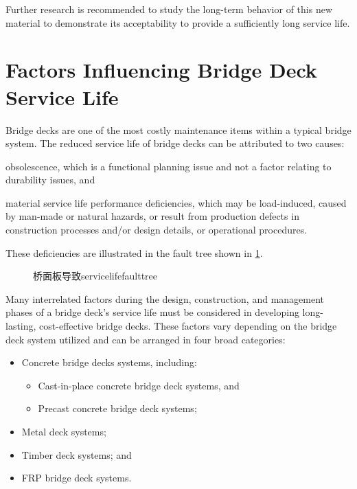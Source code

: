 Further research is recommended to study the long-term behavior of this new material to demonstrate its acceptability to provide a sufficiently long service life.

\section{Factors Influencing Bridge Deck Service Life}
\label{sec:factors-influence}

Bridge decks are one of the most costly maintenance items within a typical bridge system. The reduced service life of bridge decks can be attributed to two causes: 
\begin{enumerate*}
  \item obsolescence, which is a functional planning issue and not a factor relating to durability issues, and 
  \item material service life performance deficiencies, which may be load-induced, caused by man-made or natural hazards, or result from production defects in construction processes and/or design details, or operational procedures. 
\end{enumerate*}
These deficiencies are illustrated in the fault tree shown in \cref{fig:fault-tree-bridge-deck}.

\begin{figure}
  \caption{桥面板导致\gls*{servicelife}\gls*{faulttree}}
  \label{fig:fault-tree-bridge-deck}
\end{figure}

Many interrelated factors during the design, construction, and management phases of a bridge deck’s service life must be considered in developing long-lasting, cost-effective bridge decks. These factors vary depending on the bridge deck system utilized and can be arranged in four broad categories:
\begin{itemize}
  \item Concrete bridge decks systems, including:
  \begin{itemize}
    \item Cast-in-place concrete bridge deck systems, and
    \item Precast concrete bridge deck systems;
  \end{itemize}
  \item Metal deck systems;
  \item Timber deck systems; and
  \item FRP bridge deck systems.
\end{itemize}

